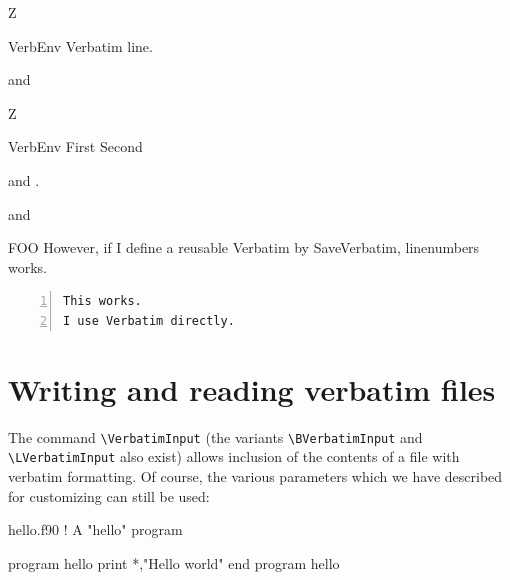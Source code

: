 \documentclass[twoside]{article}
\newcommand\cs[1]{\texttt{\textbackslash#1}}
\begin{document}
\begin{SideBySideExample}
  Z
  \begin{SaveVerbatim}{VerbEnv}
    Verbatim line.
  \end{SaveVerbatim}
  and 
\end{SideBySideExample}

\begin{SideBySideExample}
  Z
  \begin{SaveVerbatim}[gobble=5]{VerbEnv}
    First
    Second
  \end{SaveVerbatim}

  and .

   and
\end{SideBySideExample}


\begin{SideBySideExample}
\begin{SaveVerbatim}{FOO}
However, if I define a
reusable Verbatim by 
SaveVerbatim,
linenumbers works.
\end{SaveVerbatim}

\begin{Verbatim}[numbers=left]
This works.
I use Verbatim directly.
\end{Verbatim}

\end{SideBySideExample}


\clearpage

\section{Writing and reading verbatim files}
\label{sec:VerbatimInclude}

  The command \cs{VerbatimInput} (the variants \cs{BVerbatimInput} and
\cs{LVerbatimInput} also exist) allows inclusion of the contents of a file
with verbatim formatting. Of course, the various parameters which we have
described for customizing can still be used:


\typeout{*************************************}
\typeout{*************************************}

\begin{VerbatimOut}{hello.f90}
  ! A "hello" program

  program hello
    print *,"Hello world"
  end program hello
\end{VerbatimOut}
\end{document}
